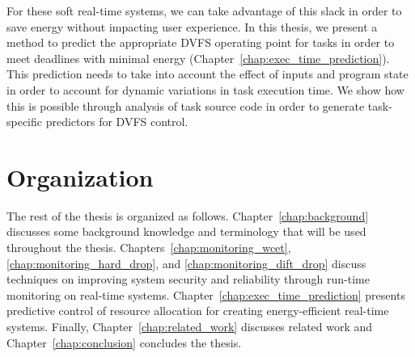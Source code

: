 For these soft real-time systems, we can take advantage of this slack in order
to save energy without impacting user experience. In this thesis, we present a
method to predict the appropriate DVFS operating point for tasks in order to
meet deadlines with minimal energy (Chapter~\ref{chap:exec_time_prediction}).
This prediction needs to take into account the effect of inputs and program
state in order to account for dynamic variations in task execution time. We
show how this is possible through analysis of task source code in order
to generate task-specific predictors for DVFS control.

\section{Organization}
The rest of the thesis is organized as follows.
Chapter~\ref{chap:background} discusses some background knowledge and
terminology that will be used throughout the thesis.
Chapters~\ref{chap:monitoring_wcet}, \ref{chap:monitoring_hard_drop}, and
\ref{chap:monitoring_dift_drop} discuss techniques on improving system security
and reliability through run-time monitoring on real-time systems. 
Chapter~\ref{chap:exec_time_prediction} presents predictive control of resource
allocation for creating energy-efficient real-time systems.
Finally, Chapter~\ref{chap:related_work}
discusses related work and Chapter~\ref{chap:conclusion} concludes the thesis.
